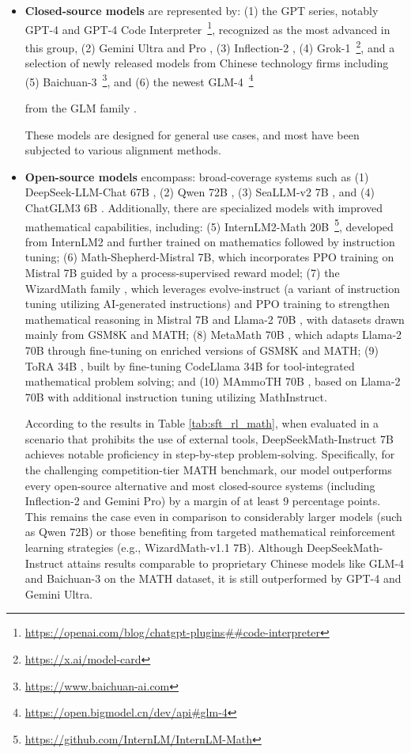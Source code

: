 \begin{itemize}[topsep=0pt]
\begin{itemize}[topsep=0pt]
    \item \textbf{Closed-source models} are represented by: (1) the GPT series, notably GPT-4 \citep{gpt4} and GPT-4 Code Interpreter~\footnote{\url{https://openai.com/blog/chatgpt-plugins\#\#code-interpreter}}, recognized as the most advanced in this group, (2) Gemini Ultra and Pro \citep{gemini}, (3) Inflection-2 \citep{inflection-2}, (4) Grok-1~\footnote{\url{https://x.ai/model-card}}, and a selection of newly released models from Chinese technology firms including (5) Baichuan-3~\footnote{\url{https://www.baichuan-ai.com}}, and (6) the newest GLM-4~\footnote{\url{https://open.bigmodel.cn/dev/api\#glm-4}}

    from the GLM family \citep{glm}.

These models are designed for general use cases, and most have been subjected to various alignment methods.

\item \textbf{Open-source models} encompass: broad-coverage systems such as (1) DeepSeek-LLM-Chat 67B \citep{deepseek-llm}, (2) Qwen 72B \citep{qwen}, (3) SeaLLM-v2 7B \citep{seallm}, and (4) ChatGLM3 6B \citep{chatglm3}. Additionally, there are specialized models with improved mathematical capabilities, including: (5) InternLM2-Math 20B~\footnote{\url{https://github.com/InternLM/InternLM-Math}}, developed from InternLM2 and further trained on mathematics followed by instruction tuning; (6) Math-Shepherd-Mistral 7B, which incorporates PPO training \citep{schulman2017proximal} on Mistral 7B \citep{mistral} guided by a process-supervised reward model; (7) the WizardMath family \citep{wizardmath}, which leverages evolve-instruct (a variant of instruction tuning utilizing AI-generated instructions) and PPO training to strengthen mathematical reasoning in Mistral 7B and Llama-2 70B \citep{llama2}, with datasets drawn mainly from GSM8K and MATH; (8) MetaMath 70B \citep{metamath}, which adapts Llama-2 70B through fine-tuning on enriched versions of GSM8K and MATH; (9) ToRA 34B \cite{tora}, built by fine-tuning CodeLlama 34B for tool-integrated mathematical problem solving; and (10) MAmmoTH 70B \citep{MathInstruct}, based on Llama-2 70B with additional instruction tuning utilizing MathInstruct.

According to the results in Table \ref{tab:sft_rl_math}, when evaluated in a scenario that prohibits the use of external tools, DeepSeekMath-Instruct 7B achieves notable proficiency in step-by-step problem-solving. Specifically, for the challenging competition-tier MATH benchmark, our model outperforms every open-source alternative and most closed-source systems (including Inflection-2 and Gemini Pro) by a margin of at least 9 percentage points. This remains the case even in comparison to considerably larger models (such as Qwen 72B) or those benefiting from targeted mathematical reinforcement learning strategies (e.g., WizardMath-v1.1 7B). Although DeepSeekMath-Instruct attains results comparable to proprietary Chinese models like GLM-4 and Baichuan-3 on the MATH dataset, it is still outperformed by GPT-4 and Gemini Ultra.


\end{itemize}
\end{itemize}
